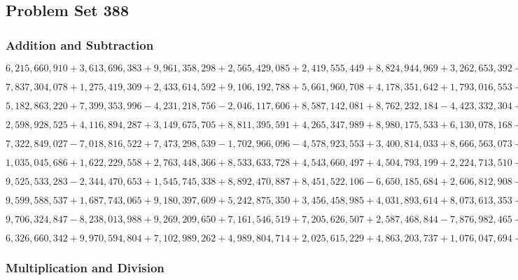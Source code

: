\hypertarget{problem-set-388}{%
\subsection{Problem Set 388}\label{problem-set-388}}

\hypertarget{addition-and-subtraction}{%
\subsubsection{Addition and
Subtraction}\label{addition-and-subtraction}}

\(6,215,660,910+3,613,696,383+9,961,358,298+2,565,429,085+2,419,555,449+8,824,944,969+3,262,653,392+1,857,908,967+1,927,623,506+2,541,252,534\)

\(7,837,304,078+1,275,419,309+2,433,614,592+9,106,192,788+5,661,960,708+4,178,351,642+1,793,016,553+5,240,031,644+9,914,585,944+4,748,792,618\)

\(5,182,863,220+7,399,353,996-4,231,218,756-2,046,117,606+8,587,142,081+8,762,232,184-4,423,332,304+9,584,994,579+7,972,130,708-2,994,990,871\)

\(2,598,928,525+4,116,894,287+3,149,675,705+8,811,395,591+4,265,347,989+8,980,175,533+6,130,078,168+9,807,514,834+2,655,459,758+3,594,753,808\)

\(7,322,849,027-7,018,816,522+7,473,298,539-1,702,966,096-4,578,923,553+3,400,814,033+8,666,563,073+5,624,341,372+9,876,071,918-7,644,609,688\)

\(1,035,045,686+1,622,229,558+2,763,448,366+8,533,633,728+4,543,660,497+4,504,793,199+2,224,713,510+7,176,692,463+1,603,958,245+9,273,695,172\)

\(9,525,533,283-2,344,470,653+1,545,745,338+8,892,470,887+8,451,522,106-6,650,185,684+2,606,812,908-2,161,620,375+1,832,392,180-2,107,592,547\)

\(9,599,588,537+1,687,743,065+9,180,397,609+5,242,875,350+3,456,458,985+4,031,893,614+8,073,613,353+9,927,943,599+7,507,518,740+3,647,387,005\)

\(9,706,324,847-8,238,013,988+9,269,209,650+7,161,546,519+7,205,626,507+2,587,468,844-7,876,982,465+8,018,898,037-3,984,990,503-7,484,292,116\)

\(6,326,660,342+9,970,594,804+7,102,989,262+4,989,804,714+2,025,615,229+4,863,203,737+1,076,047,694+7,509,986,969+5,844,835,263+2,802,028,886\)

\hypertarget{multiplication-and-division}{%
\subsubsection{Multiplication and
Division}\label{multiplication-and-division}}

